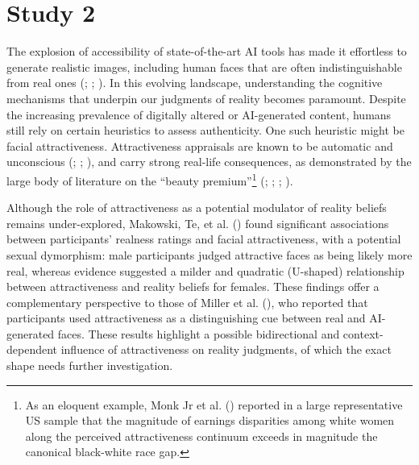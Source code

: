 \documentclass[
  jou,
  floatsintext,
  longtable,
  nolmodern,
  notxfonts,
  notimes,
  colorlinks=true,linkcolor=blue,citecolor=blue,urlcolor=blue]{apa7}
\begin{document}
\section{Study 2}\label{study-2}

The explosion of accessibility of state-of-the-art AI tools has made it
effortless to generate realistic images, including human faces that are
often indistinguishable from real ones
(;
;
). In this
evolving landscape, understanding the cognitive mechanisms that underpin
our judgments of reality becomes paramount. Despite the increasing
prevalence of digitally altered or AI-generated content, humans still
rely on certain heuristics to assess authenticity. One such heuristic
might be facial attractiveness. Attractiveness appraisals are known to
be automatic and unconscious (; ;
), and carry strong
real-life consequences, as demonstrated by the large body of literature
on the ``beauty premium''\footnote{As an eloquent example, Monk Jr et
  al. () reported in a large
  representative US sample that the magnitude of earnings disparities
  among white women along the perceived attractiveness continuum exceeds
  in magnitude the canonical black-white race gap.}
(;
;
;
).

Although the role of attractiveness as a potential modulator of reality
beliefs remains under-explored, Makowski, Te, et al.
() found significant associations
between participants' realness ratings and facial attractiveness, with a
potential sexual dymorphism: male participants judged attractive faces
as being likely more real, whereas evidence suggested a milder and
quadratic (U-shaped) relationship between attractiveness and reality
beliefs for females. These findings offer a complementary perspective to
those of Miller et al. (), who reported
that participants used attractiveness as a distinguishing cue between
real and AI-generated faces. These results highlight a possible
bidirectional and context-dependent influence of attractiveness on
reality judgments, of which the exact shape needs further investigation.
\end{document}
